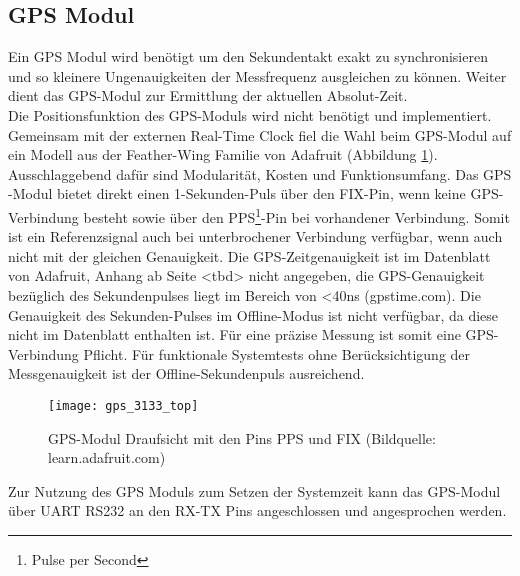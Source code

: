 \subsection{GPS Modul}
\label{cap:gps_modul}
	Ein GPS Modul wird benötigt um den Sekundentakt exakt zu synchronisieren und so kleinere Ungenauigkeiten der Messfrequenz ausgleichen zu können. Weiter dient das GPS-Modul zur Ermittlung der aktuellen Absolut-Zeit.\\
	Die Positionsfunktion des GPS-Moduls wird nicht benötigt und implementiert. Gemeinsam mit der externen Real-Time Clock fiel die Wahl beim GPS-Modul auf ein Modell aus der Feather-Wing Familie von Adafruit (Abbildung \ref{fig:GPS3133}).
	Ausschlaggebend dafür sind Modularität, Kosten und Funktionsumfang. Das GPS -Modul bietet direkt einen 1-Sekunden-Puls über den FIX-Pin, wenn keine GPS-Verbindung besteht sowie über den PPS\footnote{Pulse per Second}-Pin bei vorhandener Verbindung. Somit ist ein Referenzsignal auch bei unterbrochener Verbindung verfügbar, wenn auch nicht mit der gleichen Genauigkeit.
	Die GPS-Zeitgenauigkeit ist im Datenblatt von Adafruit, Anhang ab Seite <tbd> nicht angegeben, die GPS-Genauigkeit bezüglich des Sekundenpulses liegt im Bereich von <40ns (gpstime.com). %
	Die Genauigkeit des Sekunden-Pulses im Offline-Modus ist nicht verfügbar, da diese nicht im Datenblatt enthalten ist. Für eine präzise Messung ist somit eine GPS-Verbindung Pflicht. Für funktionale Systemtests ohne Berücksichtigung der Messgenauigkeit ist der Offline-Sekundenpuls ausreichend.
		\begin{figure}[H]
        	\centering
        	\texttt{[image: gps\_3133\_top]}
        	\caption{GPS-Modul Draufsicht mit den Pins PPS und FIX (Bildquelle: learn.adafruit.com)}
        	\label{fig:GPS3133}
    	\end{figure}
	\noindent Zur Nutzung des GPS Moduls zum Setzen der Systemzeit kann das GPS-Modul über UART RS232 an den RX-TX Pins angeschlossen und angesprochen werden.
%
%	
